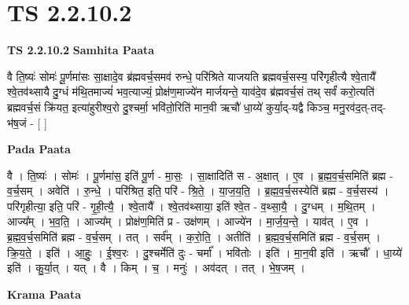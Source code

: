 \documentclass[17pt]{extarticle}
\begin{document}
\section{ TS 2.2.10.2 }

\textbf{TS 2.2.10.2 } \newline
\textbf{Samhita Paata} \newline

वै ति॒ष्यः॑ सोमः॑ पू॒र्णमा॑सः सा॒क्षादे॒व ब्र॑ह्मवर्च॒समव॑ रुन्धे॒ परि॑श्रिते याजयति ब्रह्मवर्च॒सस्य॒ परि॑गृहीत्यै श्वे॒तायै᳚ श्वे॒तव॑थ्सायै दु॒ग्धं म॑थि॒तमाज्यं॑ भव॒त्याज्यं॒ प्रोक्ष॑ण॒माज्ये॑न मार्जयन्ते॒ याव॑दे॒व ब्र॑ह्मवर्च॒सं तथ् सर्वं॑ करो॒त्यति॑ ब्रह्मवर्च॒सं क्रि॑यत॒ इत्या॑हुरीश्व॒रो दु॒श्चर्मा॒ भवि॑तो॒रिति॑ मान॒वी ऋचौ॑ धा॒य्ये॑ कुर्या॒द्-यद्वै किञ्च॒ मनु॒रव॑द॒त्-तद्-भ॑ष॒जं - [  ] \newline

\textbf{Pada Paata} \newline

वै । ति॒ष्यः॑ । सोमः॑ । पू॒र्णमा॑स॒ इति॑ पू॒र्ण - मा॒सः॒ । सा॒क्षादिति॑ स - अ॒क्षात् । ए॒व । ब्र॒ह्म॒व॒र्च॒समिति॑ ब्रह्म - व॒र्च॒सम् । अवेति॑ । रु॒न्धे॒ । परि॑श्रित॒ इति॒ परि॑ - श्रि॒ते॒ । या॒ज॒य॒ति॒ । ब्र॒ह्म॒व॒र्च॒सस्येति॑ ब्रह्म - व॒र्च॒सस्य॑ । परि॑गृहीत्या॒ इति॒ परि॑ - गृ॒ही॒त्यै॒ । श्वे॒तायै᳚ । श्वे॒तव॑थ्साया॒ इति॑ श्वे॒त - व॒थ्सा॒यै॒ । दु॒ग्धम् । म॒थि॒तम् । आज्य᳚म् । भ॒व॒ति॒ । आज्य᳚म् । प्रोक्ष॑ण॒मिति॑ प्र - उक्ष॑णम् । आज्ये॑न । मा॒र्ज॒य॒न्ते॒ । याव॑त् । ए॒व । ब्र॒ह्म॒व॒र्च॒समिति॑ ब्रह्म - व॒र्च॒सम् । तत् । सर्व᳚म् । क॒रो॒ति॒ । अतीति॑ । ब्र॒ह्म॒व॒र्च॒समिति॑ ब्रह्म - व॒र्च॒सम् । क्रि॒य॒ते॒ । इति॑ । आ॒हुः॒ । ई॒श्व॒रः । दु॒श्चर्मेति॑ दुः - चर्मा᳚ । भवि॑तोः । इति॑ । मा॒न॒वी इति॑ । ऋचौ᳚ । धा॒य्ये॑ इति॑ । कु॒र्या॒त् । यत् । वै । किम् । च॒ । मनुः॑ । अव॑दत् । तत् । भे॒ष॒जम् ।  \newline


\textbf{Krama Paata} \newline
\end{document}
